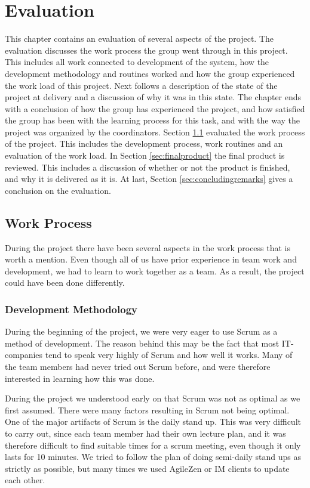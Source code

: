 \chapter{Evaluation}
\label{chap:evaluation}

This chapter contains an evaluation of several aspects of the project. The evaluation discusses the work process the group went through in this project. This includes all work connected to development of the system, how the development methodology and routines worked and how the group experienced the work load of this project. Next follows a description of the state of the project at delivery and a discussion of why it was in this state. The chapter ends with a conclusion of how the group has experienced the project, and how satisfied the group has been with the learning process for this task, and with the way the project was organized by the coordinators.
Section \ref{sec:workprocess} evaluated the work process of the project. This includes the development process, work routines and an evaluation of the work load. In Section \ref{sec:finalproduct} the final product is reviewed. This includes a discussion of whether or not the product is finished, and why it is delivered as it is. At last, Section \ref{sec:concludingremarks} gives a conclusion on the evaluation.


\section{Work Process}
\label{sec:workprocess}
During  the project there have been several aspects in the work process that is worth a mention. Even though all of us have prior experience in team work and development, we had to learn to work together as a team. As a result, the project could have been done differently. 


\subsection{Development Methodology}
During the beginning of the project, we were very eager to use Scrum as a method of development. The reason behind this may be the fact that most IT-companies tend to speak very highly of Scrum and how well it works. Many of the team members had never tried out Scrum before, and were therefore interested in learning how this was done.

During the project we understood early on that Scrum was not as optimal as we first assumed. There were many factors resulting in Scrum not being optimal. One of the major artifacts of Scrum is the daily stand up. This was very difficult to carry out, since each team member had their own lecture plan, and it was therefore difficult to find suitable times for a scrum meeting, even though it only lasts for 10 minutes. We tried to follow the plan of doing semi-daily stand ups as strictly as possible, but many times we used AgileZen or IM clients to update each other. 

